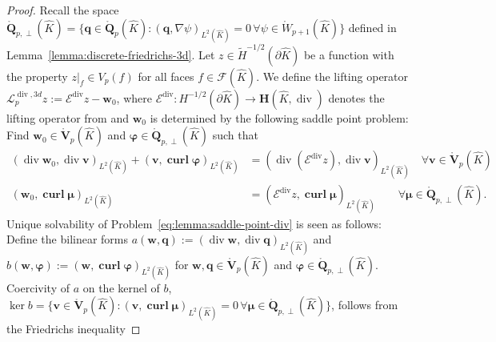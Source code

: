 \documentclass{article}
\begin{document}
\begin{proof}
Recall the space 
$\mathring{\mathbf{Q}}_{p,\perp}(\widehat K) =\{\mathbf{q}\in\mathring{\mathbf{Q}}_p(\widehat{K})
\colon\!(\mathbf{q},\nabla\psi)_{L^2(\widehat{K})} \!= 0 \, \forall \psi\in \mathring{W}_{p+1}(\widehat{K})\}$ 
defined in Lemma~\ref{lemma:discrete-friedrichs-3d}. 
Let $z\in \widetilde{H}^{-1/2}(\partial\widehat{K})$ be a function with the property $z|_f \in V_p(f)$ for all faces $f\in\mathcal{F}(\widehat{K})$. We define the lifting operator $\boldsymbol{\mathcal{L}}^{\operatorname*{div},3d}_pz:=\boldsymbol{\mathcal{E}}^{\operatorname*{div}}z-\mathbf{w}_0$, 
where $\boldsymbol{\mathcal{E}}^{\operatorname*{div}}: 
H^{-1/2}(\partial\widehat K) \rightarrow {\mathbf H}(\widehat K,\operatorname*{div})$ 
denotes the lifting operator 
from \cite{demkowicz-gopalakrishnan-schoeberl-III} and $\mathbf{w}_0$ is determined by the 
following saddle point problem: Find $\mathbf{w}_0\in \mathring{\mathbf{V}}_p(\widehat{K})$ 
and $\boldsymbol{\varphi}\in \mathring{\mathbf{Q}}_{p,\perp}(\widehat{K})$ 
such that
\begin{subequations}
\label{eq:lemma:saddle-point-div}
\begin{align}
\label{eq:lemma:saddle-point-div-a}
(\operatorname*{div}\mathbf{w}_0,\operatorname*{div}\mathbf{v})_{L^2(\widehat{K})}  +  (\mathbf{v},\operatorname*{\mathbf{curl}}\boldsymbol{\varphi})_{L^2(\widehat{K})} & =  (\operatorname*{div}(\boldsymbol{\mathcal{E}}^{\operatorname*{div}}z),\operatorname*{div}\mathbf{v})_{L^2(\widehat{K})} \quad  \forall\mathbf{v}\in \mathring{\mathbf{V}}_p(\widehat{K}) \\
\label{eq:lemma:saddle-point-div-b}
(\mathbf{w}_0,\operatorname*{\mathbf{curl}}\boldsymbol{\mu})_{L^2(\widehat{K})}  & =  (\boldsymbol{\mathcal{E}}^{\operatorname*{div}}z,\operatorname*{\mathbf{curl}}\boldsymbol{\mu})_{L^2(\widehat{K})} \qquad \forall\boldsymbol{\mu}\in \mathring{\mathbf{Q}}_{p,\perp}(\widehat{K}).
\end{align}
\end{subequations}
Unique solvability of Problem~\eqref{eq:lemma:saddle-point-div} is seen as follows: 
Define the bilinear forms $a(\mathbf{w},\mathbf{q}):=(\operatorname*{div}\mathbf{w},\operatorname*{div}\mathbf{q})_{L^2(\widehat{K})}$ and $b(\mathbf{w},\boldsymbol{\varphi}):=(\mathbf{w},\operatorname*{\mathbf{curl}}\boldsymbol{\varphi})_{L^2(\widehat{K})}$ for $\mathbf{w},\mathbf{q}\in\mathring{\mathbf{V}}_p(\widehat{K})$ and $\boldsymbol{\varphi}\in\mathring{\mathbf{Q}}_{p,\perp}(\widehat{K})$.
Coercivity of $a$ on the kernel of $b$, $\operatorname*{ker}b=\{\mathbf{v}\in\mathring{\mathbf{V}}_p(\widehat{K}): (\mathbf{v},\operatorname*{\mathbf{curl}} \boldsymbol{\mu})_{L^2(\widehat{K})} = 0 \, \forall \boldsymbol{\mu}\in \mathring{\mathbf{Q}}_{p,\perp}(\widehat{K})\}$, follows from the Friedrichs inequality 

\end{proof}
\end{document}
